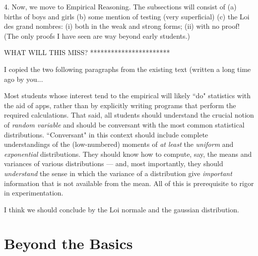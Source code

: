 4. Now, we move to Empirical Reasoning.  The subsections will consist of
(a) births of boys and girls
(b) some mention of testing (very superficial)
(c) the Loi des grand nombres: (i) both in the weak and strong forms; (ii) with no proof!  (The only proofs I have seen are way beyond early students.)

WHAT WILL THIS MISS?
***********************

{\Denis I copied the two following paragraphs from the existing text (written a long time ago by you...}

Most students whose interest tend to the empirical will likely ``do"
statistics with the aid of apps, rather than by explicitly writing
programs that perform the required calculations.  That said, all
students should understand the crucial notion of {\em random variable}
and should be conversant with the most common statistical
distributions.  ``Conversant" in this context should include complete
understandings of the (low-numbered) moments of {\em at least} the
{\em uniform} and {\em exponential} distributions.  They should know
how to compute, say, the means and variances of various distributions
— and, most importantly, they should {\em understand} the sense in
which the variance of a distribution give {\em important} information
that is not available from the mean.  All of this is prerequisite to
rigor in experimentation.




{\Denis I think we should conclude by the Loi normale and the gaussian distribution. }


\section{Beyond the Basics}

